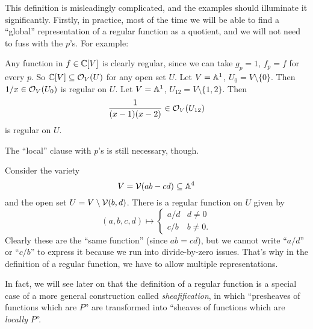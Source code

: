 This definition is misleadingly complicated,
and the examples should illuminate it significantly.
Firstly, in practice, most of the time we will be able to find
a ``global'' representation of a regular function as a quotient,
and we will not need to fuss with the $p$'s.
For example:
\begin{example}
	\listhack
	\begin{enumerate}[(a)]
		\ii Any function in $f \in \mathbb C[V]$ is clearly regular,
		since we can take $g_p = 1$, $f_p = f$ for every $p$.
		So $\mathbb C[V] \subseteq \mathcal O_V(U)$ for any open set $U$.
		\ii Let $V = \mathbb A^1$, $U_0 = V \setminus \{0\}$.
		Then $1/x \in \mathcal O_V(U_0)$ is regular on $U$.
		\ii Let $V = \mathbb A^1$, $U_{12} = V \setminus \{1,2\}$. Then 
		\[ \frac{1}{(x-1)(x-2)} \in \mathcal O_V(U_{12}) \]
		is regular on $U$.
	\end{enumerate}
\end{example}
The ``local'' clause with $p$'s is still necessary, though.
\begin{example}
	\label{ex:local_rep}
	Consider the variety
	\[ V = \mathcal V(ab-cd) \subseteq \mathbb A^4 \]
	and the open set $U = V \setminus \mathcal V(b,d)$.
	There is a regular function on $U$ given by
	\[
		(a,b,c,d)
		\mapsto
		\begin{cases}
			a/d & d \neq 0 \\
			c/b & b \neq 0.
		\end{cases}
	\]
	Clearly these are the ``same function'' (since $ab=cd$),
	but we cannot write ``$a/d$'' or ``$c/b$''
	to express it because we run into divide-by-zero issues.
	That's why in the definition of a regular function,
	we have to allow multiple representations.
\end{example}

In fact, we will see later on that the definition
of a regular function is a special case of a more
general construction called \emph{sheafification},
in which ``presheaves of functions which are $P$'' are transformed
into ``sheaves of functions which are \emph{locally} $P$''.

